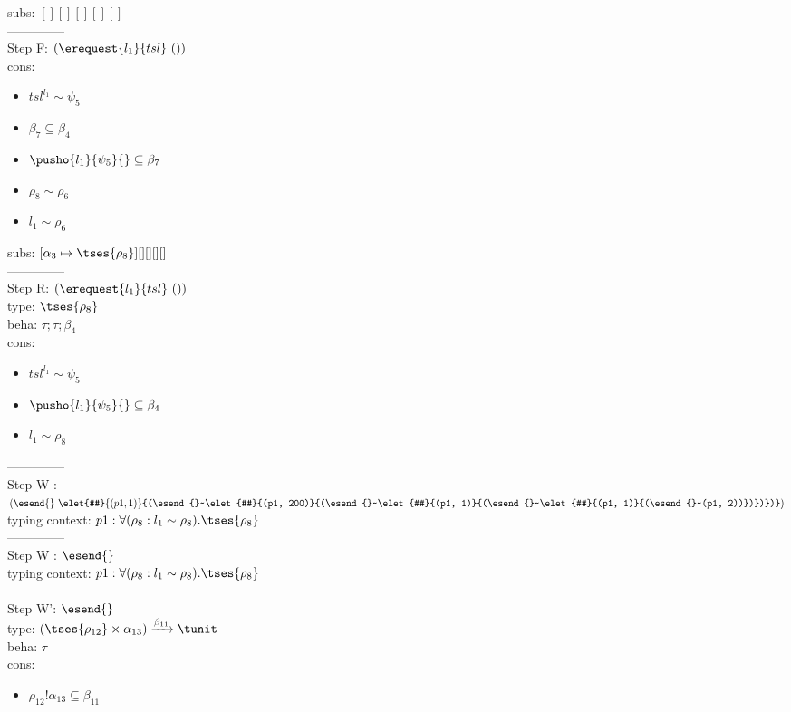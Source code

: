 \documentclass[12pt]{article}
\begin{document}
  subs:  $ [ ] [] [] [] [] $  
 \\--------------\\ 
Step F: $ (\erequest{ l_{1} }{tsl}~()) $
 \\ cons: \begin{itemize}
\item $ {tsl}^{l_{1}} \sim\psi_{5} $
\item $ \beta_{7} \subseteq \beta_{4} $
\item $ \pusho{ l_{1}} {\psi_{5}}{} \subseteq \beta_{7} $
\item $ \rho_{8} \sim\rho_{6} $
\item $ l_{1} \sim\rho_{6} $
\end{itemize}
 subs:  $ [ \alpha_{3}\mapsto \tses{ \rho_{8}}] [] [] [] [] $ 
  \\--------------\\ 
Step R: $ (\erequest{ l_{1} }{tsl}~()) $\\
  type: $  \tses{ \rho_{8}} $ 
\\  beha: $ \tau; \tau; \beta_{4} $ 
\\  cons: \begin{itemize}
\item $ {tsl}^{l_{1}} \sim\psi_{5} $
\item $ \pusho{ l_{1}} {\psi_{5}}{} \subseteq \beta_{4} $
\item $ l_{1} \sim\rho_{8} $
\end{itemize} 
  --------------\\ 
Step W : $ (\esend{}~\elet{#}{(p1, 1)}{(\esend{}~\elet{#}{(p1, 200)}{(\esend{}~\elet{#}{(p1, 1)}{(\esend{}~\elet{#}{(p1, 1)}{(\esend{}~(p1, 2))})})})}) $\\
 typing context: $ p1:\forall (\rho_{8} : l_{1} \sim\rho_{8}).  \tses{ \rho_{8}}$ 
\\ --------------\\
Step W : $ \esend{} $\\
 typing context: $ p1:\forall (\rho_{8} : l_{1} \sim\rho_{8}).  \tses{ \rho_{8}}$ 
\\ --------------\\
Step W': $ \esend{} $\\
  type: $ ( \tses{ \rho_{12}} \times \alpha_{13}) \xrightarrow{\beta_{11}} \tunit $ 
\\  beha: $ \tau $ 
\\  cons: \begin{itemize}
\item $ \rho_{12}!\alpha_{13} \subseteq \beta_{11} $
\end{itemize} 
\end{document}
